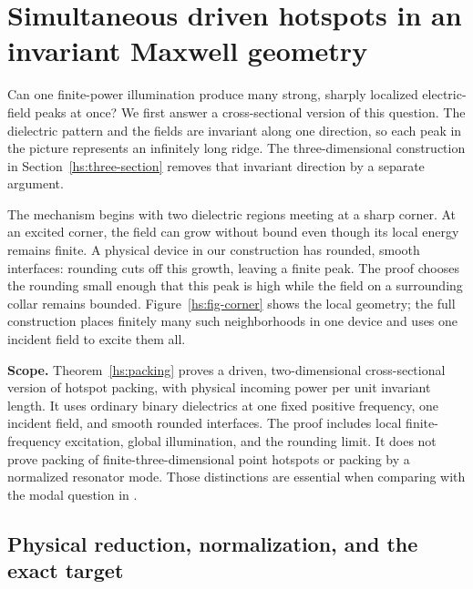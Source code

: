 \section{Simultaneous driven hotspots in an invariant Maxwell geometry}
\label{hs:section}

Can one finite-power illumination produce many strong, sharply localized
electric-field peaks at once?  We first answer a cross-sectional version
of this question.  The dielectric pattern and the fields are invariant
along one direction, so each peak in the picture represents an infinitely
long ridge.  The three-dimensional construction in
Section~\ref{hs:three-section} removes that invariant direction by a
separate argument.

The mechanism begins with two dielectric regions meeting at a sharp
corner.  At an excited corner, the field can grow without bound even
though its local energy remains finite.  A physical device in our
construction has rounded, smooth interfaces: rounding cuts off this
growth, leaving a finite peak.  The proof chooses the rounding small
enough that this peak is high while the field on a surrounding collar
remains bounded.  Figure~\ref{hs:fig-corner} shows the local geometry;
the full construction places finitely many such neighborhoods in one
device and uses one incident field to excite them all.



\noindent\textbf{Scope.}
Theorem~\ref{hs:packing} proves a driven, two-dimensional cross-sectional
version of hotspot packing, with physical incoming power per unit invariant
length.  It uses ordinary binary dielectrics at one fixed positive frequency,
one incident field, and smooth rounded interfaces.  The proof includes local
finite-frequency excitation, global illumination, and the rounding limit.
It does not prove packing of finite-three-dimensional point hotspots or
packing by a normalized resonator mode.  Those distinctions are essential
when comparing with the modal question in \cite{millerMonticone2026}.

\subsection{Physical reduction, normalization, and the exact target}
\label{hs:setup}

